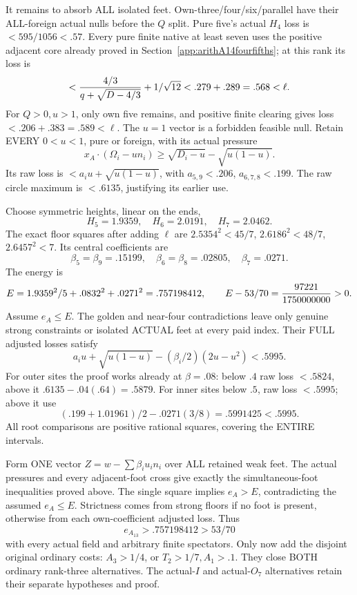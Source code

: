 \documentclass[11pt]{article}
\begin{document}
It remains to absorb ALL isolated feet.
Own-three/four/six/parallel have their ALL-foreign
actual nulls before the \(Q\) split.
Pure five's actual \(H_4\) loss is
\(<595/1056<.57\).
Every pure finite native at least seven uses
the positive adjacent core already proved in
Section~\ref{app:arithA14fourfifths};
at this rank its loss is
\[
        <{4/3\over q+\sqrt{D-4/3}}+1/\sqrt{12}
                       <.279+.289=.568<\ell .
\]
For \(Q>0,u>1\), only own five remains,
and positive finite clearing gives loss
\(<.206+.383=.589<\ell\).
The \(u=1\) vector is a forbidden feasible null.
Retain EVERY \(0<u<1\), pure or foreign,
with its actual pressure
\[
 x_A\cdot(\Omega_i-un_i)\ge
                      \sqrt{D_i-u}-\sqrt{u(1-u)}.
\]
Its raw loss is
\(<a_i u+\sqrt{u(1-u)}\),
with \(a_{5,9}<.206\), \(a_{6,7,8}<.199\).
The raw circle maximum is \(<.6135\),
justifying its earlier use.

Choose symmetric heights, linear on the ends,
\[
                         H_5=1.9359,\quad H_6=2.0191,\quad H_7=2.0462.
\]
The exact floor squares after adding \(\ell\) are
\(2.5354^2<45/7\), \(2.6186^2<48/7\),
\(2.6457^2<7\).
Its central coefficients are
\[
                    \beta_5=\beta_9=.15199,\quad
                    \beta_6=\beta_8=.02805,\quad\beta_7=.0271 .
\]
The energy is
\[
 E=1.9359^2/5+.0832^2+.0271^2=.757198412,\qquad
 E-53/70={97221\over1750000000}>0 .
\]
Assume \(e_A\le E\).
The golden and near-four contradictions leave
only genuine strong constraints or isolated
ACTUAL feet at every paid index.
Their FULL adjusted losses satisfy
\[
               a_i u+\sqrt{u(1-u)}
                          -(\beta_i/2)(2u-u^2)<.5995 .
\]
For outer sites the proof works already at
\(\beta=.08\):
below \(.4\) raw loss \(<.5824\), above it
\(.6135-.04(.64)=.5879\).
For inner sites below \(.5\), raw loss \(<.5995\);
above it use
\[
              (.199+1.01961)/2-.0271(3/8)
                                   =.5991425<.5995 .
\]
All root comparisons are positive rational
squares, covering the ENTIRE intervals.

Form ONE vector \(Z=w-\sum\beta_i u_i n_i\)
over ALL retained weak feet.
The actual pressures and every adjacent-foot
cross give exactly the simultaneous-foot
inequalities proved above.
The single square implies \(e_A>E\),
contradicting the assumed \(e_A\le E\).
Strictness comes from strong floors if no
foot is present, otherwise from each
own-coefficient adjusted loss.
Thus
\[
                             e_{A_{13}}>.757198412>53/70
\tag{A13U}\label{eq:arithA13universal}
\]
with every actual field and arbitrary finite
spectators.
Only now add the disjoint original ordinary
costs: \(A_3>1/4\), or \(T_2>1/7,A_1>.1\).
They close BOTH ordinary rank-three alternatives.
The actual-\(I\) and actual-\(O_7\) alternatives
retain their separate hypotheses and proof.
\end{document}
